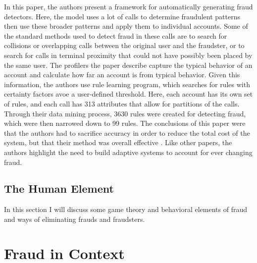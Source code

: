 \documentclass[midd]{thesis}
\begin{document}
In this paper, the authors present a framework for automatically generating fraud detectors. Here, the model uses a lot of calls to determine fraudulent patterns then use these broader patterns and apply them to individual accounts. Some of the standard methods used to detect fraud in these calls are to search for collisions or overlapping calls between the original user and the fraudster, or to search for calls in terminal proximity that could not have possibly been placed by the same user. The profilers the paper describe capture the typical behavior of an account and calculate how far an account is from typical behavior. Given this information, the authors use rule learning program, which searches for rules with certainty factors avoe a user-defined threshold. Here, each account has its own set of rules, and each call has 313 attributes that allow for partitions of the calls. Through their data mining process, 3630 rules were created for detecting fraud, which were then narrowed down to 99 rules. The conclusions of this paper were that the authors had to sacrifice accuracy in order to reduce the total cost of the system, but that their method was overall effective \cite{Fawcett1996}. Like other papers, the authors highlight the need to build adaptive systems to account for ever changing fraud.



\section{The Human Element}

In this section I will discuss some game theory and behavioral elements of fraud and ways of eliminating frauds and fraudsters.



\noindent
%
%

\pagebreak
\chapter{ Fraud in Context}
\label{sec:context}
\end{document}
